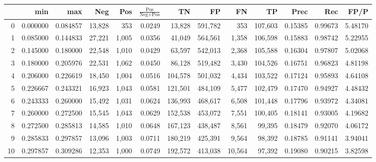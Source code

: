 \begin{tabular}{rrrrrrrrrrrrr}
\toprule
{} &       min &       max &     Neg &    Pos & $\frac{\text{Pos}}{\text{Neg}+\text{Pos}}$ &       TN &       FP &       FN &       TP &     Prec &      Rec &     FP/P \\
\midrule
0  &  0.000000 &  0.084857 &  13,828 &    353 &                                     0.0249 &   13,828 &  591,782 &      353 &  107,603 &  0.15385 &  0.99673 &  5.48170 \\
1  &  0.085000 &  0.144833 &  27,221 &  1,005 &                                     0.0356 &   41,049 &  564,561 &    1,358 &  106,598 &  0.15883 &  0.98742 &  5.22955 \\
2  &  0.145000 &  0.180000 &  22,548 &  1,010 &                                     0.0429 &   63,597 &  542,013 &    2,368 &  105,588 &  0.16304 &  0.97807 &  5.02068 \\
3  &  0.180000 &  0.205976 &  22,531 &  1,062 &                                     0.0450 &   86,128 &  519,482 &    3,430 &  104,526 &  0.16751 &  0.96823 &  4.81198 \\
4  &  0.206000 &  0.226619 &  18,450 &  1,004 &                                     0.0516 &  104,578 &  501,032 &    4,434 &  103,522 &  0.17124 &  0.95893 &  4.64108 \\
5  &  0.226667 &  0.243321 &  16,923 &  1,043 &                                     0.0581 &  121,501 &  484,109 &    5,477 &  102,479 &  0.17470 &  0.94927 &  4.48432 \\
6  &  0.243333 &  0.260000 &  15,492 &  1,031 &                                     0.0624 &  136,993 &  468,617 &    6,508 &  101,448 &  0.17796 &  0.93972 &  4.34081 \\
7  &  0.260000 &  0.272500 &  15,545 &  1,043 &                                     0.0629 &  152,538 &  453,072 &    7,551 &  100,405 &  0.18141 &  0.93005 &  4.19682 \\
8  &  0.272500 &  0.285813 &  14,585 &  1,010 &                                     0.0648 &  167,123 &  438,487 &    8,561 &   99,395 &  0.18479 &  0.92070 &  4.06172 \\
9  &  0.285833 &  0.297857 &  13,096 &  1,003 &                                     0.0711 &  180,219 &  425,391 &    9,564 &   98,392 &  0.18785 &  0.91141 &  3.94041 \\
10 &  0.297857 &  0.309286 &  12,353 &  1,000 &                                     0.0749 &  192,572 &  413,038 &   10,564 &   97,392 &  0.19080 &  0.90215 &  3.82598 \\

\end{tabular}
